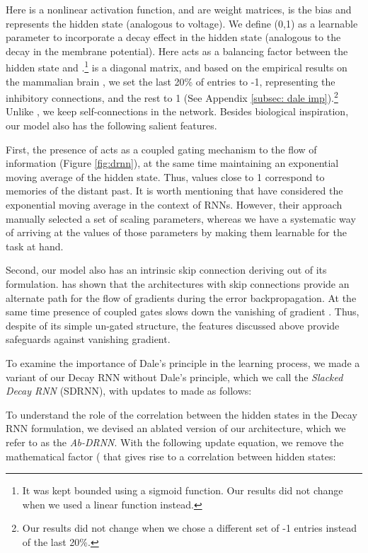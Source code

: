 \documentclass[11pt,a4paper]{article}
\begin{document}
Here  is a nonlinear activation function,  and  are weight matrices,  is the bias and  represents the hidden state (analogous to voltage). We define  (0,1) as a learnable parameter to incorporate a decay effect in the hidden state (analogous to the decay in the membrane potential). Here  acts as a balancing factor between the hidden state  and .\footnote{It was kept bounded using a sigmoid function. Our results did not change when we used a linear function instead.}
 is a diagonal matrix, and based on the empirical results on the mammalian brain \cite{hendry1981sizes}, we set the last 20\% of entries to -1, representing the inhibitory connections, and the rest to 1 (See Appendix \ref{subsec: dale imp}).\footnote{Our results did not change when we chose a different set of -1 entries instead of the last 20\%.} Unlike \citet{song2016training}, we keep self-connections in the network. Besides biological inspiration, our model also has the following salient features.



First, the presence of  acts as a coupled gating mechanism to the flow of information (Figure \ref{fig:drnn}), at the same time maintaining an exponential moving average of the hidden state. Thus,  values close to 1 correspond to memories of the distant past. It is worth mentioning that \citet{oliva2017statistical} have considered the exponential moving average in the context of RNNs. However, their approach manually selected a set of scaling parameters, whereas we have a systematic way of arriving at the values of those parameters by making them learnable for the task at hand. 

Second, our model also has an intrinsic skip connection deriving out of its formulation.\citet{yue2018residual} has shown that the architectures with skip connections provide an alternate path for the flow of gradients during the error backpropagation. At the same time presence of coupled gates slows down the vanishing of gradient \cite{bengio2013advances}. Thus, despite of its simple un-gated structure, the features discussed above provide safeguards against vanishing gradient.

To examine the importance of Dale's principle in the learning process, we made a variant of our Decay RNN without Dale's principle, which we call the {\em Slacked Decay RNN} (SDRNN), with updates to  made as follows: 
\begin{center}
    
\end{center}
To understand the role of the correlation between the hidden states in the Decay RNN formulation, we devised an ablated version of our architecture, which we refer to as the {\em Ab-DRNN}. With the following update equation, we remove the mathematical factor ( that gives rise to a correlation between hidden states:  
\begin{center}
    
\end{center}
\end{document}
